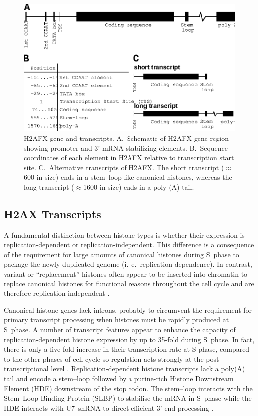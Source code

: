 \begin{figure}
\includegraphics{h2ax-review/figs/Fig2}
\caption[H2AFX gene and transcripts]%
        {H2AFX gene and transcripts. A.~Schematic of H2AFX gene region
          showing promoter and 3' mRNA stabilizing
          elements. B.~Sequence coordinates of each element in H2AFX
          relative to transcription start site\@. C.~Alternative
          transcripts of H2AFX\@. The short transcript
          ($\approx$\SI{600}{\bp} in size) ends in a stem--loop like
          canonical histones, whereas the long transcript
          ($\approx$\SI{1600}{\bp} in size) ends in a poly-(A) tail.}
\label{fig:h2ax-review:H2AFX}
\end{figure}

\subsection{H2AX Transcripts}
A fundamental distinction between histone types is whether their
expression is replication-dependent or replication-independent. This
difference is a consequence of the requirement for large amounts of
canonical histones during S~phase to package the newly duplicated
genome (i.~e.\ replication-dependence).
In contrast, variant or ``replacement'' histones often appear to be
inserted into chromatin to replace canonical histones for functional
reasons throughout the cell cycle and are therefore
replication-independent \citep{Marzluff02}.

Canonical histone genes lack introns, probably to circumvent the
requirement for primary transcript processing when histones must be
rapidly produced at S~phase. A number of transcript features appear to
enhance the capacity of replication-dependent histone expression by up
to 35-fold during S~phase.  In fact, there is only a five-fold
increase in their transcription rate at S phase, compared to the other
phases of cell cycle so regulation acts strongly at the
post-transcriptional level \citep{HarrisMCB1991}.
Replication-dependent histone transcripts lack a poly(A) tail and
encode a stem--loop followed by a purine-rich Histone Downstream
Element (HDE) downstream of the stop codon. The stem--loop interacts
with the Stem--Loop Binding Protein (SLBP) to stabilise the mRNA in
S~phase \citep{SLBP-regulation} while the HDE interacts with U7~snRNA to direct
efficient 3' end processing \citep{HDE-sequence}.

